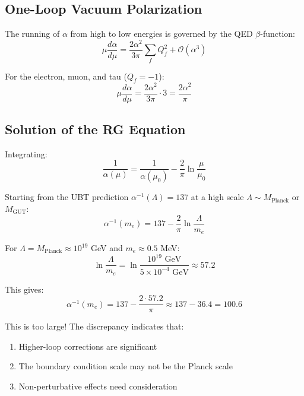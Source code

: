 \documentclass[12pt, a4paper]{article}
\begin{document}
\subsection{One-Loop Vacuum Polarization}

The running of $\alpha$ from high to low energies is governed by the QED $\beta$-function:
\begin{equation}
\mu \frac{d\alpha}{d\mu} = \frac{2\alpha^2}{3\pi} \sum_f Q_f^2 + \mathcal{O}(\alpha^3)
\end{equation}

For the electron, muon, and tau ($Q_f = -1$):
\begin{equation}
\mu \frac{d\alpha}{d\mu} = \frac{2\alpha^2}{3\pi} \cdot 3 = \frac{2\alpha^2}{\pi}
\end{equation}

\subsection{Solution of the RG Equation}

Integrating:
\begin{equation}
\frac{1}{\alpha(\mu)} = \frac{1}{\alpha(\mu_0)} - \frac{2}{\pi}\ln\frac{\mu}{\mu_0}
\end{equation}

Starting from the UBT prediction $\alpha^{-1}(\Lambda) = 137$ at a high scale $\Lambda \sim M_{\text{Planck}}$ or $M_{\text{GUT}}$:
\begin{equation}
\alpha^{-1}(m_e) = 137 - \frac{2}{\pi}\ln\frac{\Lambda}{m_e}
\end{equation}

For $\Lambda = M_{\text{Planck}} \approx 10^{19}$ GeV and $m_e \approx 0.5$ MeV:
\begin{equation}
\ln\frac{\Lambda}{m_e} = \ln\frac{10^{19} \text{ GeV}}{5 \times 10^{-4} \text{ GeV}} \approx 57.2
\end{equation}

This gives:
\begin{equation}
\alpha^{-1}(m_e) = 137 - \frac{2 \cdot 57.2}{\pi} \approx 137 - 36.4 = 100.6
\end{equation}

This is too large! The discrepancy indicates that:
\begin{enumerate}
\item Higher-loop corrections are significant
\item The boundary condition scale may not be the Planck scale
\item Non-perturbative effects need consideration
\end{enumerate}
\end{document}
